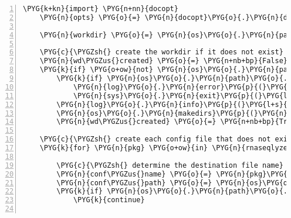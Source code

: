 \begin{Verbatim}[commandchars=\\\{\},numbers=left,firstnumber=1,stepnumber=5]
    \PYG{k+kn}{import} \PYG{n+nn}{docopt}
    \PYG{n}{opts} \PYG{o}{=} \PYG{n}{docopt}\PYG{o}{.}\PYG{n}{docopt}\PYG{p}{(}\PYG{n}{\PYGZus{}\PYGZus{}doc\PYGZus{}\PYGZus{}}\PYG{p}{)}

    \PYG{n}{workdir} \PYG{o}{=} \PYG{n}{os}\PYG{o}{.}\PYG{n}{path}\PYG{o}{.}\PYG{n}{abspath}\PYG{p}{(}\PYG{n}{opts}\PYG{p}{[}\PYG{l+s}{'}\PYG{l+s}{\textless{}workdir\textgreater{}}\PYG{l+s}{'}\PYG{p}{]}\PYG{p}{)}

    \PYG{c}{\PYGZsh{} create the workdir if it does not exist}
    \PYG{n}{wd\PYGZus{}created} \PYG{o}{=} \PYG{n+nb+bp}{False}
    \PYG{k}{if} \PYG{o+ow}{not} \PYG{n}{os}\PYG{o}{.}\PYG{n}{path}\PYG{o}{.}\PYG{n}{isdir}\PYG{p}{(}\PYG{n}{workdir}\PYG{p}{)}\PYG{p}{:}
        \PYG{k}{if} \PYG{n}{os}\PYG{o}{.}\PYG{n}{path}\PYG{o}{.}\PYG{n}{exists}\PYG{p}{(}\PYG{n}{workdir}\PYG{p}{)}\PYG{p}{:}
            \PYG{n}{log}\PYG{o}{.}\PYG{n}{error}\PYG{p}{(}\PYG{l+s}{"}\PYG{l+s}{not a directory: }\PYG{l+s}{'}\PYG{l+s+si}{\PYGZpc{}s}\PYG{l+s}{'}\PYG{l+s}{"} \PYG{o}{\PYGZpc{}} \PYG{n}{workdir}\PYG{p}{)}
            \PYG{n}{sys}\PYG{o}{.}\PYG{n}{exit}\PYG{p}{(}\PYG{l+m+mi}{1}\PYG{p}{)}
        \PYG{n}{log}\PYG{o}{.}\PYG{n}{info}\PYG{p}{(}\PYG{l+s}{"}\PYG{l+s}{creating workdir }\PYG{l+s}{'}\PYG{l+s+si}{\PYGZpc{}s}\PYG{l+s}{'}\PYG{l+s}{"} \PYG{o}{\PYGZpc{}} \PYG{n}{workdir}\PYG{p}{)}
        \PYG{n}{os}\PYG{o}{.}\PYG{n}{makedirs}\PYG{p}{(}\PYG{n}{workdir}\PYG{p}{)}
        \PYG{n}{wd\PYGZus{}created} \PYG{o}{=} \PYG{n+nb+bp}{True}

    \PYG{c}{\PYGZsh{} create each config file that does not exist}
    \PYG{k}{for} \PYG{n}{pkg} \PYG{o+ow}{in} \PYG{n}{rnaseqlyze}\PYG{p}{,} \PYG{n}{rnaseqlyze}\PYG{o}{.}\PYG{n}{web}\PYG{p}{,} \PYG{n}{rnaseqlyze}\PYG{o}{.}\PYG{n}{worker}\PYG{p}{:}

        \PYG{c}{\PYGZsh{} determine the destination file name}
        \PYG{n}{conf\PYGZus{}name} \PYG{o}{=} \PYG{n}{pkg}\PYG{o}{.}\PYG{n}{\PYGZus{}\PYGZus{}name\PYGZus{}\PYGZus{}}\PYG{o}{.}\PYG{n}{split}\PYG{p}{(}\PYG{l+s}{'}\PYG{l+s}{.}\PYG{l+s}{'}\PYG{p}{)}\PYG{p}{[}\PYG{o}{-}\PYG{l+m+mi}{1}\PYG{p}{]} \PYG{o}{+} \PYG{l+s}{"}\PYG{l+s}{.ini}\PYG{l+s}{"}
        \PYG{n}{conf\PYGZus{}path} \PYG{o}{=} \PYG{n}{os}\PYG{o}{.}\PYG{n}{path}\PYG{o}{.}\PYG{n}{join}\PYG{p}{(}\PYG{n}{workdir}\PYG{p}{,} \PYG{n}{conf\PYGZus{}name}\PYG{p}{)}
        \PYG{k}{if} \PYG{n}{os}\PYG{o}{.}\PYG{n}{path}\PYG{o}{.}\PYG{n}{exists}\PYG{p}{(}\PYG{n}{conf\PYGZus{}path}\PYG{p}{)}\PYG{p}{:}
            \PYG{k}{continue}


\end{Verbatim}

